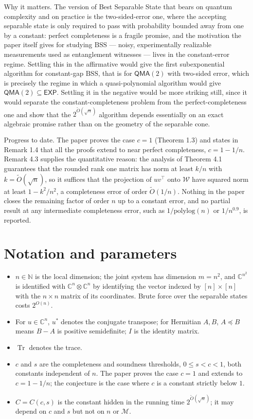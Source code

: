 \documentclass{conjura-conjecture}
\newcommand{\BSS}{\mathrm{BSS}}
\newcommand{\tO}{\tilde{O}}
\newcommand{\Tr}{\operatorname{Tr}}
\newcommand{\CC}{\mathbb{C}}
\newcommand{\QMA}{\mathsf{QMA}}
\newcommand{\EXP}{\mathsf{EXP}}
\begin{document}
Why it matters. The version of Best Separable State that bears on
quantum complexity and on practice is the two-sided-error one, where the
accepting separable state is only required to pass with probability
bounded away from one by a constant: perfect completeness is a fragile
promise, and the motivation the paper itself gives for studying $\BSS$
--- noisy, experimentally realizable measurements used as entanglement
witnesses --- lives in the constant-error regime. Settling this in the
affirmative would give the first subexponential algorithm for
constant-gap $\BSS$, that is for $\QMA(2)$ with two-sided error, which
is precisely the regime in which a quasi-polynomial algorithm would give
$\QMA(2) \subseteq \EXP$. Settling it in the negative would be more
striking still, since it would separate the constant-completeness
problem from the perfect-completeness one and show that the
$2^{\tO(\sqrt{n})}$ algorithm depends essentially on an exact algebraic
promise rather than on the geometry of the separable cone.

Progress to date. The paper proves the case $c = 1$ (Theorem 1.3) and
states in Remark 1.4 that all the proofs extend to near perfect
completeness, $c = 1 - 1/n$. Remark 4.3 supplies the quantitative
reason: the analysis of Theorem 4.1 guarantees that the rounded rank one
matrix has norm at least $k/n$ with $k = \tO(\sqrt{n})$, so it suffices
that the projection of $uv^{\top}$ onto $\mathcal{W}$ have squared norm
at least $1 - k^{2}/n^{2}$, a completeness error of order $\tO(1/n)$.
Nothing in the paper closes the remaining factor of order $n$ up to a
constant error, and no partial result at any intermediate completeness
error, such as $1/\mathrm{polylog}(n)$ or $1/n^{0.9}$, is reported.

\section{Notation and parameters}\label{sec:notation}

\begin{itemize}
\item $n \in \mathbb{N}$ is the local dimension; the joint system has
  dimension $m = n^{2}$, and $\CC^{n^{2}}$ is identified with
  $\CC^{n} \otimes \CC^{n}$ by identifying the vector indexed by
  $[n] \times [n]$ with the $n \times n$ matrix of its coordinates.
  Brute force over the separable states costs $2^{O(n)}$.
\item For $u \in \CC^{n}$, $u^{*}$ denotes the conjugate transpose; for
  Hermitian $A, B$, $A \preceq B$ means $B - A$ is positive
  semidefinite; $I$ is the identity matrix.
\item $\Tr$ denotes the trace.
\item $c$ and $s$ are the completeness and soundness thresholds,
  $0 \le s < c < 1$, both constants independent of $n$. The paper proves
  the case $c = 1$ and extends to $c = 1 - 1/n$; the conjecture is the
  case where $c$ is a constant strictly below $1$.
\item $C = C(c,s)$ is the constant hidden in the running time
  $2^{\tO(\sqrt{n})}$; it may depend on $c$ and $s$ but not on $n$ or
  $\mathcal{M}$.
\end{itemize}
\end{document}
